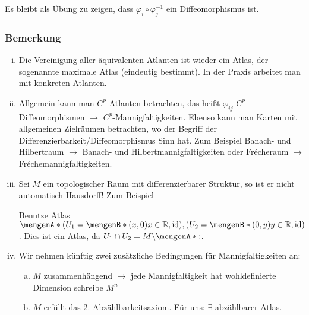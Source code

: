 \begin{enumerate}[(i)]
\begin{enumerate}[(1)]
	Es bleibt als Übung zu zeigen, dass $\varphi_i \circ \varphi^{-1}_j$ ein Diffeomorphismus ist.
		\end{enumerate}
\end{enumerate}	

\subsubsection[Bemerkungen zu abstrakten Mannigfaltigkeiten]{Bemerkung}
\label{ssub:116}
\begin{enumerate}[(i)]
	\item Die Vereinigung aller äquivalenten Atlanten ist wieder ein Atlas, der sogenannte maximale Atlas (eindeutig bestimmt). In der Praxis arbeitet man mit konkreten Atlanten.
	\item Allgemein kann man $C^p$-Atlanten betrachten, das heißt $\varphi_{ij}$ $C^p$-Diffeomorphismen $\to$ $C^p$-Mannigfaltigkeiten. Ebenso kann man Karten mit allgemeinen Zielräumen betrachten, wo der Begriff der Differenzierbarkeit/Diffeomorphismus Sinn hat. Zum Beispiel Banach- und Hilbertraum $\to$ Banach- und Hilbertmannigfaltigkeiten oder Frécheraum $\to$ Fréchemannigfaltigkeiten.
	\item Sei $M$ ein topologischer Raum mit differenzierbarer Struktur, so ist er nicht automatisch Hausdorff! Zum Beispiel
\begin{figure}[H]
\end{figure}
Benutze Atlas $\set{\enbrace{U_1=\set[(x,0)]{x\in \mathds{R}},\id},\enbrace{U_2=\set[(0,y)]{y\in \mathds{R}},\id}}$. Dies ist ein Atlas, da $U_1\cap U_2 = M\backslash \set{:}$.
\item Wir nehmen künftig zwei zusätzliche Bedingungen für Mannigfaltigkeiten an:
	\begin{enumerate}[(a)]
		\item $M$ zusammenhängend $\to$ jede Mannigfaltigkeit hat wohldefinierte Dimension schreibe $M^n$
		\item $M$ erfüllt das 2. Abzählbarkeitsaxiom. Für uns: $\exists$ abzählbarer Atlas.
	\end{enumerate}
\end{enumerate}

